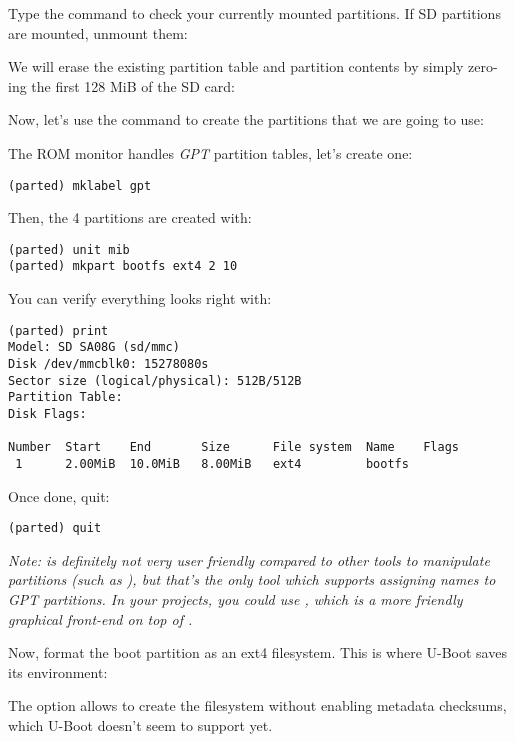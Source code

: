 Type the  command to check your currently mounted
partitions. If SD partitions are mounted, unmount them:


We will erase the existing partition table and partition contents
by simply zero-ing the first 128 MiB of the SD card:


Now, let's use the  command to create the partitions that
we are going to use:


The ROM monitor handles {\em GPT} partition tables, let's create one:

\begin{verbatim}
(parted) mklabel gpt
\end{verbatim}

Then, the 4 partitions are created with:
\begin{verbatim}
(parted) unit mib
(parted) mkpart bootfs ext4 2 10
\end{verbatim}

You can verify everything looks right with:

\begin{verbatim}
(parted) print
Model: SD SA08G (sd/mmc)
Disk /dev/mmcblk0: 15278080s
Sector size (logical/physical): 512B/512B
Partition Table: 
Disk Flags:

Number  Start    End       Size      File system  Name    Flags
 1      2.00MiB  10.0MiB   8.00MiB   ext4         bootfs

\end{verbatim}

Once done, quit:
\begin{verbatim}
(parted) quit
\end{verbatim}

{\em Note:  is definitely not very user friendly compared
to other tools to manipulate partitions (such as ), but
that's the only tool which supports assigning names to GPT partitions.
In your projects, you could use , which is a more
friendly graphical front-end on top of .}

Now, format the boot partition as an ext4 filesystem. This is where
U-Boot saves its environment:

The  option allows to create the filesystem
without enabling metadata checksums, which U-Boot doesn't seem to
support yet.

